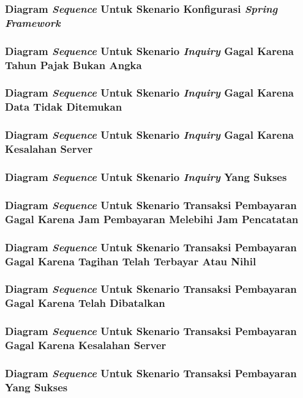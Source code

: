 \documentclass[pdftex,12pt, oneside]{article}
\begin{document}
\subsubsection{Diagram \textit{Sequence} Untuk Skenario Konfigurasi \textit{Spring Framework}}
\subsubsection{Diagram \textit{Sequence} Untuk Skenario \textit{Inquiry} Gagal Karena Tahun Pajak Bukan Angka}
\subsubsection{Diagram \textit{Sequence} Untuk Skenario \textit{Inquiry} Gagal Karena Data Tidak Ditemukan}
\subsubsection{Diagram \textit{Sequence} Untuk Skenario \textit{Inquiry} Gagal Karena Kesalahan Server}
\subsubsection{Diagram \textit{Sequence} Untuk Skenario \textit{Inquiry} Yang Sukses}
\subsubsection{Diagram \textit{Sequence} Untuk Skenario Transaksi Pembayaran Gagal Karena Jam Pembayaran Melebihi Jam Pencatatan}
\subsubsection{Diagram \textit{Sequence} Untuk Skenario Transaksi Pembayaran Gagal Karena Tagihan Telah Terbayar Atau Nihil}
\subsubsection{Diagram \textit{Sequence} Untuk Skenario Transaksi Pembayaran Gagal Karena Telah Dibatalkan}
\subsubsection{Diagram \textit{Sequence} Untuk Skenario Transaksi Pembayaran Gagal Karena Kesalahan Server}
\subsubsection{Diagram \textit{Sequence} Untuk Skenario Transaksi Pembayaran Yang Sukses}
\end{document}
